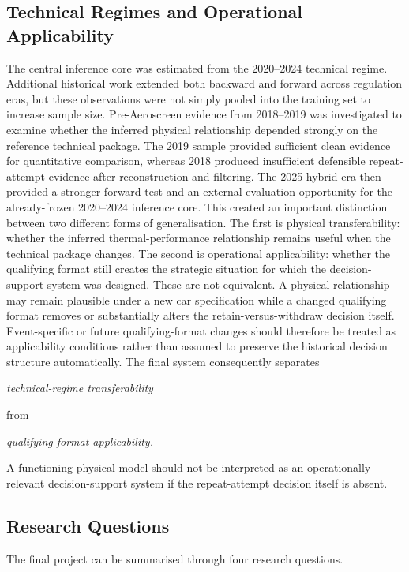 \subsection{Technical Regimes and Operational Applicability}
The central inference core was estimated from the 2020--2024 technical regime. Additional historical work extended both backward and forward across regulation eras, but these observations were not simply pooled into the training set to increase sample size. Pre-Aeroscreen evidence from 2018--2019 was investigated to examine whether the inferred physical relationship depended strongly on the reference technical package. The 2019 sample provided sufficient clean evidence for quantitative comparison, whereas 2018 produced insufficient defensible repeat-attempt evidence after reconstruction and filtering. The 2025 hybrid era then provided a stronger forward test and an external evaluation opportunity for the already-frozen 2020--2024 inference core. This created an important distinction between two different forms of generalisation. The first is physical transferability: whether the inferred thermal-performance relationship remains useful when the technical package changes. The second is operational applicability: whether the qualifying format still creates the strategic situation for which the decision-support system was designed. These are not equivalent. A physical relationship may remain plausible under a new car specification while a changed qualifying format removes or substantially alters the retain-versus-withdraw decision itself. Event-specific or future qualifying-format changes should therefore be treated as applicability conditions rather than assumed to preserve the historical decision structure automatically. The final system consequently separates

\begin{center}\textit{technical-regime transferability}\end{center}

from

\begin{center}\textit{qualifying-format applicability.}\end{center}

A functioning physical model should not be interpreted as an operationally relevant decision-support system if the repeat-attempt decision itself is absent.

\subsection{Research Questions}
The final project can be summarised through four research questions.


